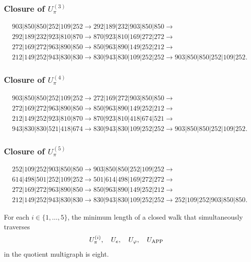 \subsubsection{Closure of \texorpdfstring{\(U_\pi^{(3)}\)}{U-pi 3}}
\begin{align*}
&903|850|850|252|109|252\to
292|189|232|903|850|850\to\\
&292|189|232|923|810|870\to
870|923|810|169|272|272\to\\
&272|169|272|963|890|850\to
850|963|890|149|252|212\to\\
&212|149|252|943|830|830\to
830|943|830|109|252|252\to
903|850|850|252|109|252.
\end{align*}

\subsubsection{Closure of \texorpdfstring{\(U_\pi^{(4)}\)}{U-pi 4}}
\begin{align*}
&903|850|850|252|109|252\to
272|169|272|903|850|850\to\\
&272|169|272|963|890|850\to
850|963|890|149|252|212\to\\
&212|149|252|923|810|870\to
870|923|810|418|674|521\to\\
&943|830|830|521|418|674\to
830|943|830|109|252|252\to
903|850|850|252|109|252.
\end{align*}

\subsubsection{Closure of \texorpdfstring{\(U_\pi^{(5)}\)}{U-pi 5}}
\begin{align*}
&252|109|252|903|850|850\to
903|850|850|252|109|252\to\\
&614|498|501|252|109|252\to
501|614|498|169|272|272\to\\
&272|169|272|963|890|850\to
850|963|890|149|252|212\to\\
&212|149|252|943|830|830\to
830|943|830|109|252|252\to
252|109|252|903|850|850.
\end{align*}

\begin{theorem}
\label{p12-83-c9-s1:thm:minimalidad-cierres-pi-autonoma}
For each \(i\in\{1,\ldots,5\}\), the minimum length of a closed walk
that simultaneously traverses
\[
 U_\pi^{(i)},\quad U_e,\quad U_\varphi,\quad U_{\rm APP}
\]
in the quotient multigraph is eight.
\end{theorem}

